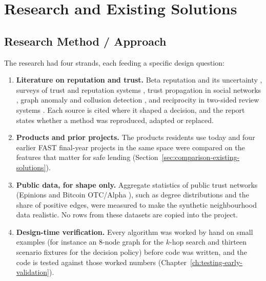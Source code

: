 \chapter{Research and Existing Solutions}\label{ch:research-existing-solutions}
\section{Research Method / Approach}\label{sec:research-method-approach}
The research had four strands, each feeding a specific design question:

\begin{enumerate}
\item \textbf{Literature on reputation and trust.} Beta reputation and its uncertainty \cite{josang2002beta,josang2016subjective}, surveys of trust and reputation systems \cite{josang2007survey,resnick2000}, trust propagation in social networks \cite{golbeck2005,kamvar2003}, graph anomaly and collusion detection \cite{akoglu2015,mukherjee2012,hooi2016}, and reciprocity in two-sided review systems \cite{bolton2013,fradkin2021}. Each source is cited where it shaped a decision, and the report states whether a method was reproduced, adapted or replaced.
\item \textbf{Products and prior projects.} The products residents use today and four earlier FAST final-year projects in the same space were compared on the features that matter for safe lending (Section~\ref{sec:comparison-existing-solutions}).
\item \textbf{Public data, for shape only.} Aggregate statistics of public trust networks (Epinions \cite{massa2007} and Bitcoin OTC/Alpha \cite{kumar2016,kumar2018}), such as degree distributions and the share of positive edges, were measured to make the synthetic neighbourhood data realistic. No rows from these datasets are copied into the project.
\item \textbf{Design-time verification.} Every algorithm was worked by hand on small examples (for instance an 8-node graph for the $k$-hop search and thirteen scenario fixtures for the decision policy) before code was written, and the code is tested against those worked numbers (Chapter~\ref{ch:testing-early-validation}).
\end{enumerate}

